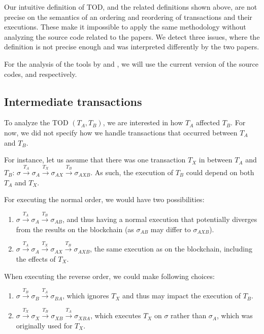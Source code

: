 \documentclass[draft,final]{vutinfth} %
\begin{document}
Our intuitive definition of TOD, and the related definitions shown above, are not precise on the semantics of an ordering and reordering of transactions and their executions. These make it impossible to apply the same methodology without analyzing the source code related to the papers. We detect three issues, where the definition is not precise enough and was interpreted differently by the two papers.

For the analysis of the tools by \cite{zhang_combatting_2023} and \cite{torres_frontrunner_2021}, we will use the current version of the source codes, \cite{noauthor_troublorerebus-redgiant_2024} and \cite{noauthor_christoftorresfrontrunner-jones_2024} respectively.

\subsection{Intermediate transactions}

To analyze the TOD $(T_A, T_B)$, we are interested in how $T_A$ affected $T_B$. For now, we did not specify how we handle transactions that occurred between $T_A$ and $T_B$.

For instance, let us assume that there was one transaction $T_X$ in between $T_A$ and $T_B$: $\sigma \xrightarrow{T_A} \sigma_A \xrightarrow{T_X} \sigma_{AX} \xrightarrow{T_B} \sigma_{AXB}$. As such, the execution of $T_B$ could depend on both $T_A$ and $T_X$.

For executing the normal order, we would have two possibilities:

\begin{enumerate}
    \item $\sigma \xrightarrow{T_A} \sigma_A \xrightarrow{T_B} \sigma_{AB}$, and thus having a normal execution that potentially diverges from the results on the blockchain (as $\sigma_{AB}$ may differ to $\sigma_{AXB}$).
    \item $\sigma \xrightarrow{T_A} \sigma_A \xrightarrow{T_X} \sigma_{AX} \xrightarrow{T_B} \sigma_{AXB}$, the same execution as on the blockchain, including the effects of $T_X$.
\end{enumerate}

When executing the reverse order, we could make following choices:

\begin{enumerate}
    \item $\sigma \xrightarrow{T_B} \sigma_B \xrightarrow{T_A} \sigma_{BA}$, which ignores $T_X$ and thus may impact the execution of $T_B$.
    \item $\sigma \xrightarrow{T_X} \sigma_X \xrightarrow{T_B} \sigma_{XB} \xrightarrow{T_A} \sigma_{XBA}$, which executes $T_X$  on $\sigma$ rather than $\sigma_A$, which was originally used for $T_X$.
\end{enumerate}
\end{document}
